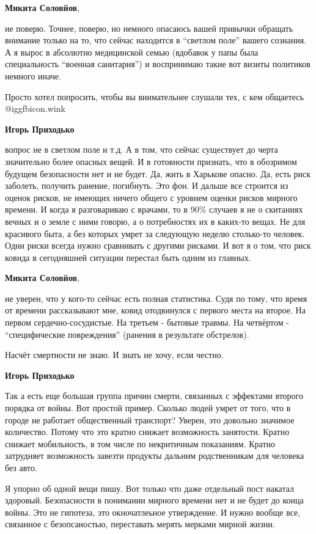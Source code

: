 \begin{itemize}
\begin{itemize}
\textbf{Микита Соловйов}, 

не поверю. Точнее, поверю, но немного опасаюсь вашей привычки обращать внимание
только на то, что сейчас находится в \enquote{светлом поле} вашего сознания. А я вырос
в абсолютно медицинской семью (вдобавок у папы была специальность \enquote{военная
санитария}) и воспринимаю такие вот визиты политиков немного иначе.

Просто хотел попросить, чтобы вы внимательнее слушали тех, с кем общаетесь @igg{fbicon.wink} 

\textbf{Игорь Приходько} 

вопрос не в светлом поле и т.д. А в том, что сейчас существует до черта
значительно более опасных вещей. И в готовности признать, что в обозримом
будущем безопасности нет и не будет. Да, жить в Харькове опасно. Да, есть риск
заболеть, получить ранение, погибнуть. Это фон. И дальше все строится из оценок
рисков, не имеющих ничего общего с уровнем оценки рисков мирного времени. И
когда я разговариваю с врачами, то в 90\% случаев я не о скитаниях вечных и о
земле с ними говорю, а о потребностях их в каких-то вещах. Не для красивого
быта, а без которых умрет за следующую неделю столько-то человек. Одни риски
всегда нужно сравнивать с другими рисками. И вот я о том, что риск ковида в
сегодняшней ситуации перестал быть одним из главных.

\textbf{Микита Соловйов}, 

не уверен, что у кого-то сейчас есть полная статистика. Судя по тому, что время
от времени рассказывают мне, ковид отодвинулся с первого места на второе. На
первом сердечно-сосудистые. На третьем - бытовые травмы. На четвёртом -
\enquote{специфические повреждения} (ранения в результате обстрелов).

Насчёт смертности не знаю. И знать не хочу, если честно.

\textbf{Игорь Приходько} 

Так а есть еще большая группа причин смерти, связанных с эффектами второго
порядка от войны. Вот простой пример. Сколько людей умрет от того, что в городе
не работает общественный транспорт? Уверен, это довольно значимое количество.
Потому что это кратно снижает возможность занятости. Кратно снижает
мобильность, в том числе по некритичным показаниям. Кратно затрудняет
возможность завезти продукты дальним родственникам для человека без авто.

Я упорно об одной вещи пишу. Вот только что даже отдельный пост накатал
здоровый. Безопасности в понимании мирного времени нет и не будет до конца
войны. Это не гипотеза, это окночатлеьное утверждение. И нужно вообще все,
связанное с безопсаностью, переставать мерять мерками мирной жизни.


\end{itemize}
\end{itemize}
